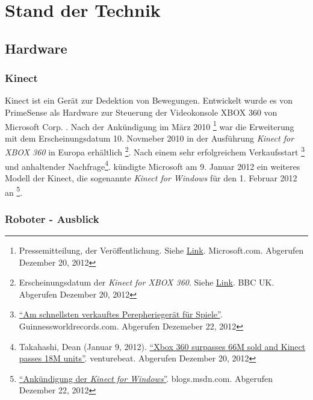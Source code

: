\chapter{Stand der Technik}
\label{chap:Stand der Technik}

\section{Hardware}
\subsection{Kinect}
Kinect ist ein Ger\"at zur Dedektion von Bewegungen. Entwickelt wurde es von PrimeSense als Hardware zur Steuerung der Videokonsole 
XBOX 360 von Microsoft Corp. . Nach der Ank\"undigung im M\"arz 2010 \footnote{Pressemitteilung, der Ver\"offentlichung. Siehe \href{https://www.microsoft.com/en-us/news/press/2010/mar10/03-31PrimeSensePR.aspx}{Link}. Microsoft.com.  Abgerufen Dezember 20, 2012}
war die Erweiterung mit dem Erscheinungsdatum 10. Novmeber 2010 in der Ausf\"uhrung \textit{Kinect for XBOX 360} in Europa erh\"altlich \footnote{Erscheinungsdatum der \textit{Kinect for XBOX 360}. Siehe \href{http://www.bbc.co.uk/newsbeat/10996389}{Link}. BBC UK. Abgerufen Dezember 20, 2012}.
Nach einem sehr erfolgreichem Verkaufsstart \footnote{\href{http://www.guinnessworldrecords.com/records-9000/fastest-selling-gaming-peripheral/}{\enquote{Am schnellsten verkauftes Perepherieger\"at f\"ur Spiele}}. Guinnessworldrecords.com. Abgerufen Dezemeber 22, 2012}
und anhaltender Nachfrage\footnote{Takahashi, Dean (Januar 9, 2012). \href{http://venturebeat.com/2012/01/09/xbox-360-surpassed-66m-sold-and-kinect-has-sold-18m-units/}{\enquote{Xbox 360 surpasses 66M sold and Kinect passes 18M units}}. venturebeat. Abgerufen Dezember 20, 2012}.
k\"undigte Microsoft am 9. Januar 2012 ein weiteres Modell der Kinect, die sogenannte \textit{Kinect for Windows} f\"ur den 1. Februar 2012 an \footnote{\href{https://blogs.msdn.com/b/kinectforwindows/archive/2012/01/09/kinect-for-windows-commercial-program-announced.aspx?Redirected=true}{\enquote{Ank\"undigung der \textit{Kinect for Windows}}}. blogs.msdn.com. Abgerufen Dezember 22, 2012}.

\subsection {Roboter - Ausblick}
